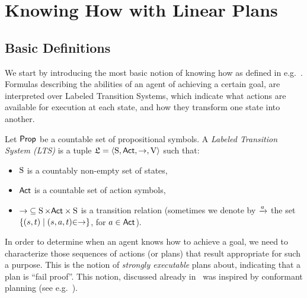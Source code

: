 \section{Knowing How with Linear Plans}
\label{sec:khlinearplans}

\subsection{Basic Definitions}

We start by introducing the most basic notion of knowing how as defined in e.g.~\cite{Wang15lori,Wang16,Wang2016}. Formulas describing the abilities of an agent of achieving a certain goal, are interpreted over Labeled Transition Systems, which indicate what actions are available for execution at each state, and how they transform one state into another.

\begin{definition}\label{def:lts}
    Let $\PROP$ be a countable set of propositional symbols. 
    A \emph{Labeled Transition System (LTS)}  is a tuple
    $\model=\tup{\S,\ACT,\ra,\V}$ such that:
    \begin{itemize}
        \item $\S$ is a countably non-empty set of states,
        \item $\ACT$ is a countable set of action symbols,
        \item ${\ra} \subseteq \S \times \ACT \times \S$ is a transition relation (sometimes we denote by $\reach{a}$ the set $\set{(s,t) \mid (s,a,t){\in}{\ra}}$, for $a\in\ACT$).
    \end{itemize}
\end{definition}

In order to determine when an agent knows how to achieve a goal, we need to characterize those sequences of actions (or plans) that result appropriate for such a purpose. This is the notion of \emph{strongly executable} plans about, indicating that a plan is ``fail proof''. This notion, discussed already in~\cite{Wang15lori,Wang16,Wang2016} was inspired by conformant planning (see e.g.~\cite{Smith&Weld98,Bonet2010}).

